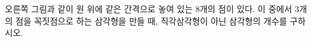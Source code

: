 \hspace*{2mm}\begin{minipage}[t]{\dimexpr\linewidth-2mm\relax}\vspace{0pt}
\noindent\begin{minipage}[t]{0.58\linewidth}\vspace{0pt}\raggedright 오른쪽 그림과 같이 원 위에 같은 간격으로 놓여 있는 $8$개의 점이 있다. 이 중에서 $3$개의 점을 꼭짓점으로 하는 삼각형을 만들 때, 직각삼각형이 아닌 삼각형의 개수를 구하시오.\end{minipage}\hfill\begin{minipage}[t]{0.4\linewidth}\vspace{0pt}\centering \resizebox{\ifdim\width>\linewidth\linewidth\else\width\fi}{!}{}\end{minipage}\par\end{minipage}
